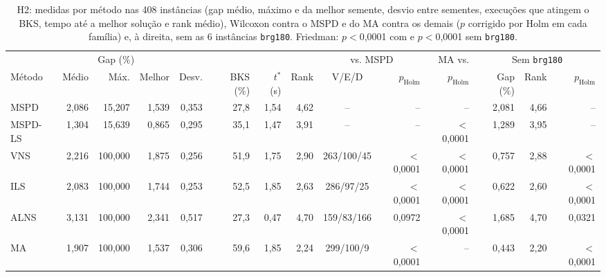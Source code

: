 \begin{table}[t]
\centering
\caption{H2: medidas por método nas 408 instâncias (gap médio, máximo e da melhor semente, desvio entre sementes, execuções que atingem o BKS, tempo até a melhor solução e rank médio), Wilcoxon contra o MSPD e do MA contra os demais ($p$ corrigido por Holm em cada família) e, à direita, sem as 6 instâncias \texttt{brg180}. Friedman: $p<$0,0001 com e $p<$0,0001 sem \texttt{brg180}.}
\label{tab:h2}
\scriptsize
\setlength{\tabcolsep}{2.6pt}
\begin{tabular}{lrrrrrrrcrr|rrr}
\toprule
 & \multicolumn{3}{c}{Gap (\%)} & & & & & \multicolumn{2}{c}{vs. MSPD} & MA vs. & \multicolumn{3}{c}{Sem \texttt{brg180}} \\
\cmidrule(lr){2-4}\cmidrule(lr){9-10}\cmidrule(lr){12-14}
Método & Médio & Máx. & Melhor & Desv. & BKS (\%) & $t^*$ (s) & Rank & V/E/D & $p_{\mathrm{Holm}}$ & $p_{\mathrm{Holm}}$ & Gap (\%) & Rank & $p_{\mathrm{Holm}}$ \\
\midrule
MSPD & 2,086 & 15,207 & 1,539 & 0,353 & 27,8 & 1,54 & 4,62 & -- & -- & -- & 2,081 & 4,66 & -- \\
MSPD-LS & 1,304 & 15,639 & 0,865 & 0,295 & 35,1 & 1,47 & 3,91 & -- & -- & $<$0,0001 & 1,289 & 3,95 & -- \\
VNS & 2,216 & 100,000 & 1,875 & 0,256 & 51,9 & 1,75 & 2,90 & 263/100/45 & $<$0,0001 & $<$0,0001 & 0,757 & 2,88 & $<$0,0001 \\
ILS & 2,083 & 100,000 & 1,744 & 0,253 & 52,5 & 1,85 & 2,63 & 286/97/25 & $<$0,0001 & $<$0,0001 & 0,622 & 2,60 & $<$0,0001 \\
ALNS & 3,131 & 100,000 & 2,341 & 0,517 & 27,3 & 0,47 & 4,70 & 159/83/166 & 0,0972 & $<$0,0001 & 1,685 & 4,70 & 0,0321 \\
MA & 1,907 & 100,000 & 1,537 & 0,306 & 59,6 & 1,85 & 2,24 & 299/100/9 & $<$0,0001 & -- & 0,443 & 2,20 & $<$0,0001 \\
\bottomrule
\end{tabular}
\end{table}
